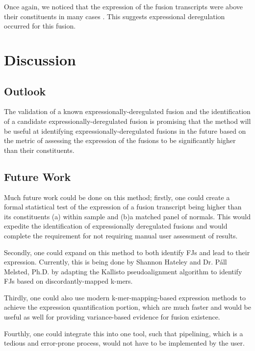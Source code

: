Once again, we noticed that the expression of the fusion transcripts were above their constituents in many cases . This suggests expressional deregulation occurred for this fusion.

\section{Discussion}

\subsection{Outlook}
The validation of a known expressionally-deregulated fusion and the identification of a candidate expressionally-deregulated fusion is promising that the method will be useful at identifying expressionally-deregulated fusions in the future based on the metric of assessing the expression of the fusions to be significantly higher than their constituents.

\subsection{Future Work}
  
Much future work could be done on this method; firstly, one could create a formal statistical test of the expression of a fusion transcript being higher than its constituents (a) within sample and (b)a matched panel of normals. This would expedite the identification of expressionally deregulated fusions and would complete the requirement for not requiring manual user assessment of results.

Secondly, one could expand on this method to both identify FJs and lead to their expression. Currently, this is being done by Shannon Hateley and Dr. P\'{a}ll Melsted, Ph.D. by adapting the Kallisto pseudoalignment algorithm\cite{bray_near-optimal_2016} to identify FJs based on discordantly-mapped k-mers.

Thirdly, one could also use modern k-mer-mapping-based expression methods to achieve the expression quantification portion, which are much faster and would be useful as well for providing variance-based evidence for fusion existence.

Fourthly, one could integrate this into one tool, such that pipelining, which is a tedious and error-prone process, would not have to be implemented by the user.









